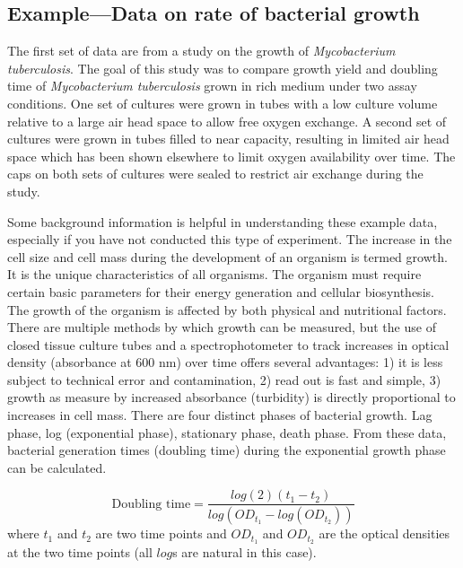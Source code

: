 \documentclass[]{tufte-book}
\begin{document}
\hypertarget{exampledata-on-rate-of-bacterial-growth}{%
\subsection{Example---Data on rate of bacterial growth}\label{exampledata-on-rate-of-bacterial-growth}}

The first set of data are from a study on the growth of \emph{Mycobacterium
tuberculosis}. The goal of this study was to compare growth yield and doubling
time of \emph{Mycobacterium tuberculosis} grown in rich medium under two assay
conditions. One set of cultures were grown in tubes with a low culture volume
relative to a large air head space to allow free oxygen exchange. A second set
of cultures were grown in tubes filled to near capacity, resulting in limited
air head space which has been shown elsewhere to limit oxygen availability over
time. The caps on both sets of cultures were sealed to restrict air exchange
during the study.

Some background information is helpful in understanding these example data,
especially if you have not conducted this type of experiment. The increase in
the cell size and cell mass during the development of an organism is termed
growth. It is the unique characteristics of all organisms. The organism must
require certain basic parameters for their energy generation and cellular
biosynthesis. The growth of the organism is affected by both physical and
nutritional factors. There are multiple methods by which growth can be measured,
but the use of closed tissue culture tubes and a spectrophotometer to track
increases in optical density (absorbance at 600 nm) over time offers several
advantages: 1) it is less subject to technical error and contamination, 2) read
out is fast and simple, 3) growth as measure by increased absorbance (turbidity)
is directly proportional to increases in cell mass. There are four distinct
phases of bacterial growth. Lag phase, log (exponential phase), stationary
phase, death phase. From these data, bacterial generation times (doubling time)
during the exponential growth phase can be calculated.

\[
\mbox{Doubling time} = \frac{log(2)(t_1 - t_2)}{log(OD_{t_1} - log(OD_{t_2}))}
\]
where \(t_1\) and \(t_2\) are two time points and \(OD_{t_1}\) and \(OD_{t_2}\) are the
optical densities at the two time points (all \(log\)s are natural in this case).
\end{document}
